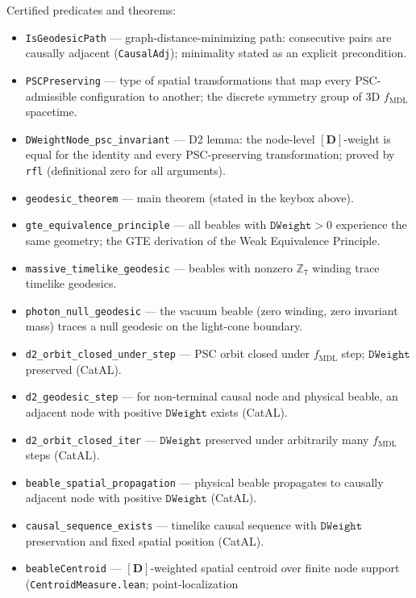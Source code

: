 \documentclass[11pt,a4paper]{article}
\theoremstyle{definition}
\begin{document}
Certified predicates and theorems:
\begin{itemize}[nosep]
\item \lstinline|IsGeodesicPath| --- graph-distance-minimizing path: consecutive
  pairs are causally adjacent (\lstinline|CausalAdj|); minimality stated as an
  explicit precondition.
\item \lstinline|PSCPreserving| --- type of spatial transformations that map every
  PSC-admissible configuration to another; the discrete symmetry group of
  3D $f_\mathrm{MDL}$ spacetime.
\item \lstinline|DWeightNode_psc_invariant| --- D2 lemma: the node-level
  $[\mathbf{D}]$-weight is equal for the identity and every PSC-preserving
  transformation; proved by \texttt{rfl} (definitional zero for all arguments).
\item \lstinline|geodesic_theorem| --- main theorem (stated in the keybox above).
\item \lstinline|gte_equivalence_principle| --- all beables with $\mathtt{DWeight} > 0$
  experience the same geometry; the GTE derivation of the Weak Equivalence Principle.
\item \lstinline|massive_timelike_geodesic| --- beables with nonzero $\mathbb{Z}_7$
  winding trace timelike geodesics.
\item \lstinline|photon_null_geodesic| --- the vacuum beable (zero winding, zero
  invariant mass) traces a null geodesic on the light-cone boundary.
\item \lstinline|d2_orbit_closed_under_step| --- PSC orbit closed under
  $f_{\mathrm{MDL}}$ step; $\mathtt{DWeight}$ preserved (CatAL).
\item \lstinline|d2_geodesic_step| --- for non-terminal causal node and physical
  beable, an adjacent node with positive $\mathtt{DWeight}$ exists (CatAL).
\item \lstinline|d2_orbit_closed_iter| --- $\mathtt{DWeight}$ preserved under
  arbitrarily many $f_{\mathrm{MDL}}$ steps (CatAL).
\item \lstinline|beable_spatial_propagation| --- physical beable propagates to
  causally adjacent node with positive $\mathtt{DWeight}$ (CatAL).
\item \lstinline|causal_sequence_exists| --- timelike causal sequence with
  $\mathtt{DWeight}$ preservation and fixed spatial position (CatAL).
\item \lstinline|beableCentroid| --- $[\mathbf{D}]$-weighted spatial centroid
  over finite node support (\texttt{CentroidMeasure.lean}; point-localization

\end{itemize}
\end{document}
